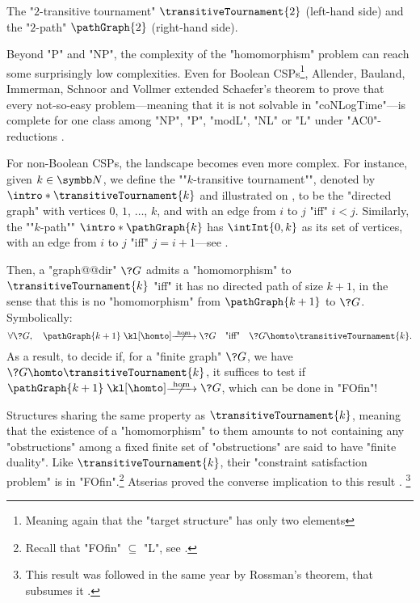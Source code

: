 \begin{marginfigure}
	\centering
	\begin{tikzpicture}
		
	\end{tikzpicture}
	\hspace{4em}
	\begin{tikzpicture}
		
	\end{tikzpicture}
	\caption{
		\AP\label{fig:T2-P2}
		The "$2$-transitive tournament" $\transitiveTournament{2}$
		(left-hand side) and the "$2$-path" $\pathGraph{2}$ (right-hand side).
	}
\end{marginfigure}
Beyond "P" and "NP", the complexity of the "homomorphism" problem can reach some
surprisingly low complexities.
Even for Boolean CSPs\footnote{Meaning again that the "target structure" has only two elements},
Allender, Bauland, Immerman, Schnoor and Vollmer extended Schaefer's theorem to
prove that every not-so-easy problem---meaning that it is not solvable in "coNLogTime"---is
complete for one class among "NP", "P", "modL", "NL" or "L" under "AC0"-reductions
\cite[Theorem~3.1]{AllenderBaulandImmermanSchnoorVollmer2009Schaefer}.

For non-Boolean CSPs, the landscape becomes even more complex.
For instance, given $k\in\N$, we define the \AP""$k$-transitive tournament"", denoted
by \AP$\intro*\transitiveTournament{k}$ and illustrated on ,
to be the "directed graph" with vertices $0$, $1$, $\dotsc$, $k$,
and with an edge from $i$ to $j$ "iff" $i < j$.
Similarly, the \AP""$k$-path"" \AP$\intro*\pathGraph{k}$ has $\intInt{0,k}$ as
its set of vertices, with an edge from $i$ to $j$ "iff" $j = i + 1$---see .

Then, a "graph@@dir" $\?G$ admits a "homomorphism" to $\transitiveTournament{k}$ "iff"
it has no directed path of size $k+1$, in the sense that this is no "homomorphism"
from $\pathGraph{k+1}$ to $\?G$. Symbolically:
\[
	\forall \?G,\quad
	\pathGraph{k+1} \nothomto \?G
	\quad\text{"iff"}\quad
	\?G \homto \transitiveTournament{k}.
\]
As a result, to decide if, for a "finite graph" $\?G$, we have
$\?G \homto \transitiveTournament{k}$, it suffices
to test if $\pathGraph{k+1} \nothomto \?G$, which can be done in "FOfin"!

Structures sharing the same property as $\transitiveTournament{k}$, meaning that
the existence of a "homomorphism" to them amounts to not containing any "obstructions"
among a fixed finite set of "obstructions" are said to have "finite duality".
Like $\transitiveTournament{k}$, their "constraint satisfaction problem"
is in "FOfin".\footnote{Recall that "FOfin" $\subseteq$ "L", see .}
Atserias proved the converse implication to this result \cite[Corollary 4]{Atserias2008DigraphColoring}.%
\footnote{This result was followed in the same year
by Rossman's theorem, that subsumes it \cite[Theorem~1.3]{Rossman2008Homomorphism}.}

